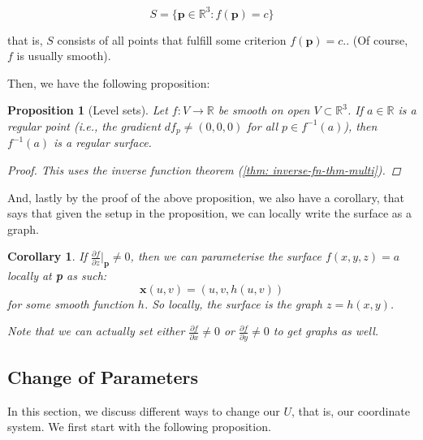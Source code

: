 \documentclass[10pt, a4paper]{article}
\newcommand{\R}{\mathbb{R}}
\theoremstyle{plain}
\newtheorem{proposition}[theorem]{Proposition}
\newtheorem{corollary}[theorem]{Corollary}
\theoremstyle{definition}
\theoremstyle{remark}
\newenvironment{sidenote}{%
  \par\vspace{0.5em}%
  \noindent\color{defcolor}%
}{%
  \par\vspace{0.5em}%
  \color{black}%
}
\begin{document}
$$S = \{ \textbf{p} \in \R^3:f(\textbf{p}) = c\}$$

that is, $S$ consists of all points that fulfill some criterion $f(\textbf{p})=c.$. (Of course, $f$ is usually smooth).

Then, we have the following proposition:


\begin{proposition}[Level sets]
  Let $f:V\to\mathbb{R}$ be smooth on open $V\subset\mathbb{R}^3$. If $a\in\mathbb{R}$ is a regular point (i.e., the gradient $df_p \neq (0,0,0)$ for all $p \in f^{-1}(a)$), then $f^{-1}(a)$ is a regular surface.

  \begin{proof}
      This uses the inverse function theorem (\ref{thm: inverse-fn-thm-multi}).
  \end{proof}
\end{proposition}

And, lastly by the proof of the above proposition, we also have a corollary, that says that given the setup in the proposition, we can locally write the surface as a graph.

\begin{corollary}
    If $\frac{\partial f}{\partial z} \Big|_\textbf{p} \neq 0$, then we can parameterise the surface $f(x,y,z) =a$ locally at \textbf{p} as such:
    $$\textbf{x}(u,v) = (u,v,h(u,v))$$for some smooth function $h$. So locally, the surface is the graph $z = h(x,y)$. 
    \begin{sidenote}
        Note that we can actually set either $\frac{\partial f}{\partial x} \neq 0 $ or $\frac{\partial f}{\partial y} \neq 0$ to get graphs as well.
    \end{sidenote}
\end{corollary}




\pagebreak
\subsection{Change of Parameters}

In this section, we discuss different ways to change our $U$, that is, our coordinate system. We first start with the following proposition.
\end{document}
